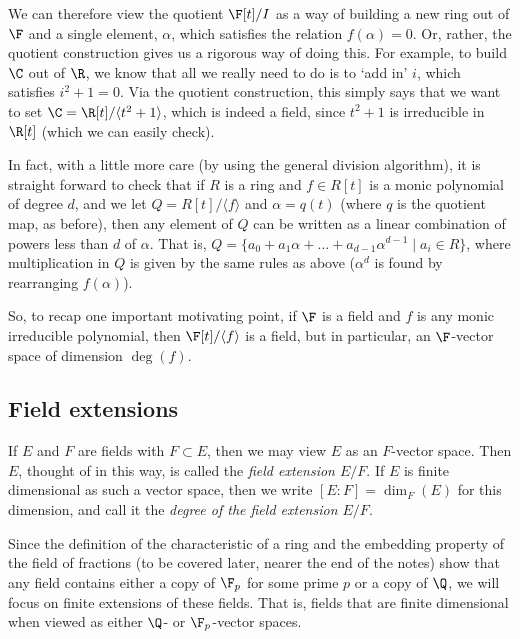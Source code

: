 \documentclass{maths}
\begin{document}
We can therefore view the quotient $\F[t]/I$ as a way of building a new ring out of $\F$ and a single element, $\alpha$, which satisfies the relation $f(\alpha)=0$.
Or, rather, the quotient construction gives us a rigorous way of doing this.
For example, to build $\C$ out of $\R$, we know that all we really need to do is to `add in' $i$, which satisfies $i^2+1=0$.
Via the quotient construction, this simply says that we want to set $\C=\R[t]/\langle t^2+1\rangle$, which is indeed a field, since $t^2+1$ is irreducible in $\R[t]$ (which we can easily check).

In fact, with a little more care (by using the general division algorithm), it is straight forward to check that if $R$ is a ring and $f\in R[t]$ is a monic polynomial of degree $d$, and we let $Q=R[t]/\langle f\rangle$ and $\alpha=q(t)$ (where $q$ is the quotient map, as before), then any element of $Q$ can be written as a linear combination of powers less than $d$ of $\alpha$.
That is, $Q=\{a_0+a_1\alpha+\ldots+a_{d-1}\alpha^{d-1} \mid a_i\in R\}$, where multiplication in $Q$ is given by the same rules as above ($\alpha^d$ is found by rearranging $f(\alpha)$).

So, to recap one important motivating point, if $\F$ is a field and $f$ is any monic irreducible polynomial, then $\F[t]/\langle f\rangle$ is a field, but in particular, an $\F$-vector space of dimension $\deg(f)$.

\subsection{Field extensions}

\begin{defn}
If $E$ and $F$ are fields with $F\subset E$, then we may view $E$ as an $F$-vector space.
Then $E$, thought of in this way, is called the \emph{field extension $E/F$}.
If $E$ is finite dimensional as such a vector space, then we write $[E:F]=\dim_F(E)$ for this dimension, and call it the \emph{degree of the field extension $E/F$}.
\end{defn}

Since the definition of the characteristic of a ring and the embedding property of the field of fractions (to be covered later, nearer the end of the notes) show that any field contains either a copy of $\F_p$ for some prime $p$ or a copy of $\Q$, we will focus on finite extensions of these fields.
That is, fields that are finite dimensional when viewed as either $\Q$- or $\F_p$-vector spaces.
\end{document}
